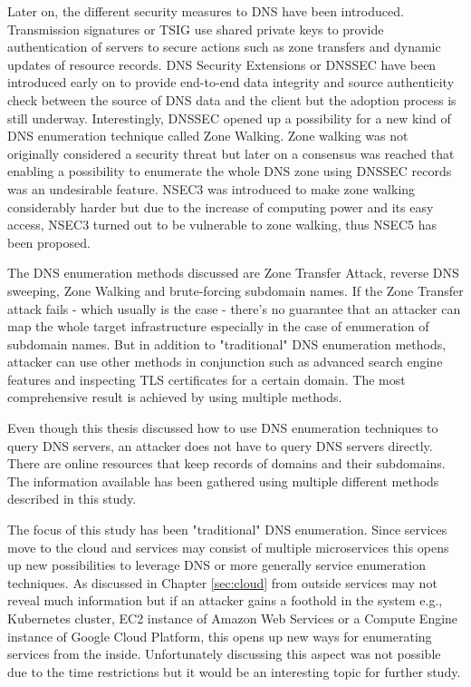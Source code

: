 Later on, the different security measures to DNS have been introduced. Transmission signatures or TSIG use shared private keys to provide authentication of servers to secure actions such as zone transfers and dynamic updates of resource records. DNS Security Extensions or DNSSEC have been introduced early on to provide end-to-end data integrity and source authenticity check between the source of DNS data and the client but the adoption process is still underway. Interestingly, DNSSEC opened up a possibility for a new kind of DNS enumeration technique called Zone Walking. Zone walking was not originally considered a security threat but later on a consensus was reached that enabling a possibility to enumerate the whole DNS zone using DNSSEC records was an undesirable feature. NSEC3 was introduced to make zone walking considerably harder but due to the increase of computing power and its easy access, NSEC3 turned out to be vulnerable to zone walking, thus NSEC5 has been proposed.

The DNS enumeration methods discussed are Zone Transfer Attack, reverse DNS sweeping, Zone Walking and brute-forcing subdomain names. If the Zone Transfer attack fails - which usually is the case - there's no guarantee that an attacker can map the whole target infrastructure especially in the case of enumeration of subdomain names. But in addition to "traditional" DNS enumeration methods, attacker can use other methods in conjunction such as advanced search engine features and inspecting TLS certificates for a certain domain. The most comprehensive result is achieved by using multiple methods.

Even though this thesis discussed how to use DNS enumeration techniques to query DNS servers, an attacker does not have to query DNS servers directly. There are online resources that keep records of domains and their subdomains. The information available has been gathered using multiple different methods described in this study.

The focus of this study has been "traditional" DNS enumeration. Since services move to the cloud and services may consist of multiple microservices this opens up new possibilities to leverage DNS or more generally service enumeration techniques. As discussed in Chapter \ref{sec:cloud} from outside services may not reveal much information but if an attacker gains a foothold in the system e.g., Kubernetes cluster, EC2 instance of Amazon Web Services or a Compute Engine instance of Google Cloud Platform, this opens up new ways for enumerating services from the inside. Unfortunately discussing this aspect was not possible due to the time restrictions but it would be an interesting topic for further study.


